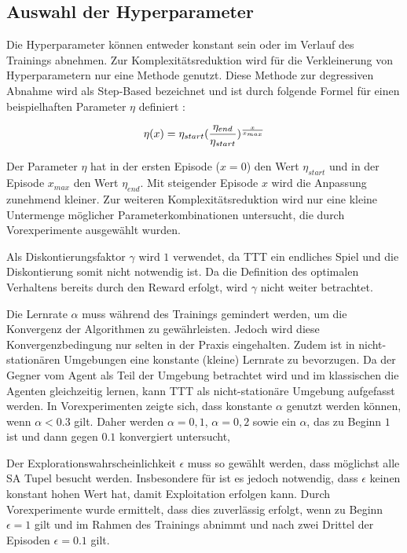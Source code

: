 

\subsection{Auswahl der Hyperparameter}
\label{sec:hyperparameter}
Die Hyperparameter können entweder konstant sein oder im Verlauf des Trainings abnehmen. 
Zur Komplexitätsreduktion wird für die Verkleinerung von Hyperparametern nur eine Methode genutzt.
Diese Methode zur degressiven Abnahme wird als Step-Based bezeichnet und ist durch folgende Formel für einen beispielhaften Parameter $\eta$ definiert \cite[S. 3]{parkNovelLearningRate2020} :

\begin{equation}\label{eq:Eq3}\equationentry{Step-Based Parameterabnahme}
   \eta(x) = \eta_{start}(\frac{\eta_{end}}{\eta_{start}})^{\frac{x}{x_{max}}}
\end{equation}

Der Parameter $\eta$  hat in der ersten Episode ($x=0$) den Wert $\eta_{start}$ und in der Episode $x_{max}$ den Wert $\eta_{end}$. 
Mit steigender Episode $x$ wird die Anpassung zunehmend kleiner. 
Zur weiteren Komplexitätsreduktion wird nur eine kleine Untermenge möglicher Parameterkombinationen untersucht, die durch Vorexperimente ausgewählt wurden. 

Als Diskontierungsfaktor $\gamma$ wird $1$ verwendet, da \acs{TTT} ein endliches Spiel und die Diskontierung somit nicht notwendig ist. 
Da die Definition des optimalen Verhaltens bereits durch den Reward erfolgt, wird $\gamma$ nicht weiter betrachtet.

Die Lernrate $\alpha$ muss während des Trainings gemindert werden, um die Konvergenz der Algorithmen zu gewährleisten. 
Jedoch wird diese Konvergenzbedingung nur selten in der Praxis eingehalten. 
Zudem ist in nicht-stationären Umgebungen eine konstante (kleine) Lernrate zu bevorzugen. \cite[S. 33]{suttonReinforcementLearningIntroduction2018} 
Da der Gegner vom Agent als Teil der Umgebung betrachtet wird und im klassischen \splay die Agenten gleichzeitig lernen, kann \acs{TTT} als nicht-stationäre Umgebung aufgefasst werden.  
In Vorexperimenten zeigte sich, dass konstante $\alpha$  genutzt werden können, wenn $\alpha < 0.3$ gilt.
Daher werden $\alpha=0,1$, $\alpha=0,2$ sowie ein $\alpha$, das zu Beginn $1$ ist und dann gegen $0.1$ konvergiert untersucht, 

Der Explorationswahrscheinlichkeit $\epsilon$ muss so gewählt werden, dass möglichst alle \ac{SA Tupel} besucht werden.
Insbesondere für \sarsa ist es jedoch notwendig, dass $\epsilon$ keinen konstant hohen Wert hat, damit Exploitation erfolgen kann. 
Durch Vorexperimente wurde ermittelt, dass dies zuverlässig erfolgt, wenn zu Beginn $\epsilon = 1$ gilt und im Rahmen des Trainings abnimmt und nach zwei Drittel der Episoden $\epsilon = 0.1$ gilt.